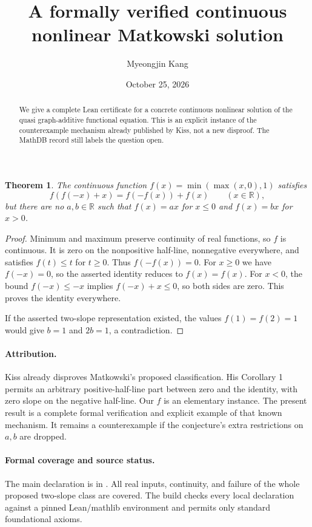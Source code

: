 \documentclass[11pt]{article}
\title{A formally verified continuous nonlinear Matkowski solution}
\author{Myeongjin Kang}
\date{October 25, 2026}
\newtheorem{theorem}{Theorem}
\begin{document}
\maketitle
\begin{abstract}
We give a complete Lean certificate for a concrete continuous nonlinear
solution of the quasi graph-additive functional equation. This is an
explicit instance of the counterexample mechanism already published by
Kiss, not a new disproof. The MathDB record still labels the question open.
\end{abstract}
\begin{theorem}
The continuous function $f(x)=\min(\max(x,0),1)$ satisfies
\[
 f(f(-x)+x)=f(-f(x))+f(x)\qquad(x\in\mathbb R),
\]
but there are no $a,b\in\mathbb R$ such that $f(x)=ax$ for $x\le0$ and
$f(x)=bx$ for $x>0$.
\end{theorem}
\begin{proof}
Minimum and maximum preserve continuity of real functions, so $f$ is
continuous. It is zero on the nonpositive half-line, nonnegative
everywhere, and satisfies $f(t)\le t$ for $t\ge0$. Thus $f(-f(x))=0$.
For $x\ge0$ we have $f(-x)=0$, so the asserted identity reduces to
$f(x)=f(x)$. For $x<0$, the bound $f(-x)\le -x$ implies
$f(-x)+x\le0$, so both sides are zero. This proves the identity everywhere.

If the asserted two-slope representation existed, the values
$f(1)=f(2)=1$ would give $b=1$ and $2b=1$, a contradiction.
\end{proof}
\paragraph{Attribution.}
Kiss \cite{Kiss} already disproves Matkowski's proposed classification.
His Corollary 1 permits an arbitrary positive-half-line part between zero
and the identity, with zero slope on the negative half-line. Our $f$ is
an elementary instance. The present result is a complete formal
verification and explicit example of that known mechanism. It remains a
counterexample if the conjecture's extra restrictions on $a,b$ are dropped.

\paragraph{Formal coverage and source status.}
The main declaration is
 in
. All real inputs, continuity, and failure of
the whole proposed two-slope class are covered. The build checks every
local declaration against a pinned Lean/mathlib environment and permits
only standard foundational axioms.
\end{document}
